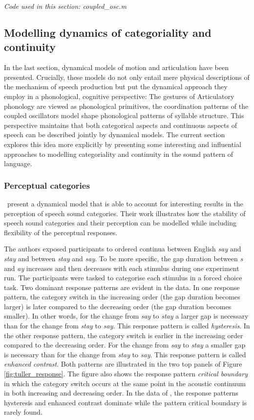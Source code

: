 \medskip\noindent \textit{Code used in this section: coupled\_osc.m}

\subsection{Modelling dynamics of categoriality and continuity}

In the last section, dynamical models of motion and articulation have been presented. Crucially, these models do not only entail mere physical descriptions of the mechanism of speech production but put the dynamical approach they employ in a phonological, cognitive perspective: The gestures of Articulatory phonology are viewed as phonological primitives, the coordination patterns of the coupled oscillators model shape phonological patterns of syllable structure. This perspective maintains that both categorical aspects and continuous aspects of speech can be described jointly by dynamical models. The current section explores this idea more explicitly by presenting some interesting and influential approaches to modelling categoriality and continuity in the sound pattern of language.

\subsubsection{Perceptual categories}

\citet{Tulleretal1994} present a dynamical model that is able to account for interesting results in the perception of speech sound categories. Their work illustrates how the stability of speech sound categories and their perception can be modelled while including flexibility of the perceptual responses.

The authors exposed participants to ordered continua between English \emph{say} and \emph{stay} and between \emph{stay} and \emph{say}. To be more specific, the gap duration between \emph{s} and \emph{ay} increases and then decreases with each stimulus during one experiment run. The participants were tasked to categorise each stimulus in a forced choice task. Two dominant response patterns are evident in the data. In one response pattern, the category switch in the increasing order (the gap duration becomes larger) is later compared to the decreasing order (the gap duration becomes smaller). In other words, for the change from \emph{say} to \emph{stay} a larger gap is necessary than for the change from \emph{stay} to \emph{say}. This response pattern is called \emph{hysteresis}. In the other response pattern, the category switch is earlier in the increasing order compared to the decreasing order. For the change from \emph{say} to \emph{stay} a smaller gap is necessary than for the change from \emph{stay} to \emph{say}. This response pattern is called \emph{enhanced contrast}. Both patterns are illustrated in the two top panels of Figure \ref{fig:tuller_response}. The figure also shows the response pattern \emph{critical boundary} in which the category switch occurs at the same point in the acoustic continuum in both increasing and decreasing order. In the data of \citet{Tulleretal1994}, the response patterns hysteresis and enhanced contrast dominate while the pattern critical boundary is rarely found.

